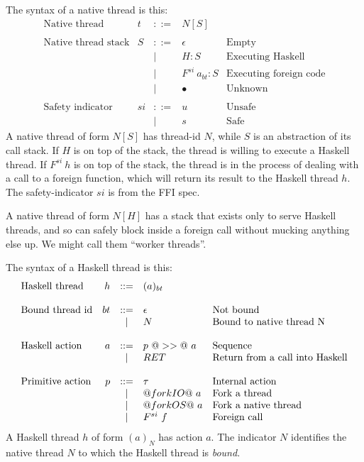 \documentclass{article}
\newcommand{\hcall}{H}
\newcommand{\fcall}[2]{F^{#1}~#2}
\newcommand{\ret}[1]{RET~#1}
\begin{document}
The syntax of a native thread is this:
$$
\begin{array}{lrcll}
\mbox{Native thread} &  t & ::= & N[S] \\
\\
\mbox{Native thread stack} &  S & ::= & \epsilon & \mbox{Empty}\\
        & & | & \hcall : S  & \mbox{Executing Haskell} \\
        & & | & \fcall{si}{a_{bt}} : S & \mbox{Executing foreign code} \\
        & & | & \bullet & \mbox{Unknown}\\
\\
\mbox{Safety indicator} &  si & ::= & u & \mbox{Unsafe} \\
        & & | & s & \mbox{Safe}
\end{array}
$$
A native thread of form $N[S]$ has thread-id $N$, while $S$ is
an abstraction of its call stack.  If $\hcall$ is on top of the stack,
the thread is willing to execute a Haskell thread. 
If $\fcall{si}{h}$ is
on top of the stack, the thread is in the process of dealing with a call
to a foreign function, which will return its result to the Haskell thread
$h$.  The safety-indicator $si$ is from the FFI spec.

A native thread of form $N[H]$ has a stack that exists only to serve Haskell 
threads, and so can safely block inside a foreign call without mucking anything
else up.  We might call them ``worker threads''.

The syntax of a Haskell thread is this:
$$
\begin{array}{lrcll}
\mbox{Haskell thread} &  h & ::= & (a)_{bt} \\
\\
\mbox{Bound thread id} & bt & ::= & \epsilon & \mbox{Not bound} \\
        & & | & N & \mbox{Bound to native thread N} \\
\\
\mbox{Haskell action} &  a & ::= & p ~@>>@~ a  & \mbox{Sequence} \\
        & & | & \ret  & \mbox{Return from a call into Haskell} \\
\\
\mbox{Primitive action} &  p & ::= & \tau & \mbox{Internal action} \\
        & & | & @forkIO@~a & \mbox{Fork a thread} \\
        & & | & @forkOS@~a & \mbox{Fork a native thread} \\
        & & | & \fcall{si}{f} & \mbox{Foreign call} 
\end{array}
$$
A Haskell thread $h$ of form $(a)_{N}$ has action $a$.  The indicator
$N$ identifies the native thread $N$ to which the Haskell thread is \emph{bound}.
\end{document}
